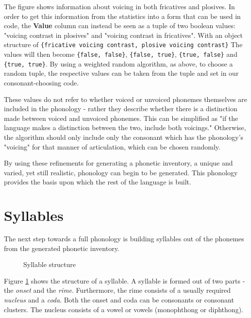 \documentclass{report}
\begin{document}
	The figure shows information about voicing in both fricatives and plosives. In order to get this information from the statistics into a form that can be used in code, the \textbf{Value} column can instead be seen as a tuple of two boolean values: "voicing contrast in plosives" and "voicing contrast in fricatives". With an object structure of \verb|{fricative voicing contrast, plosive voicing contrast}| The values will then become \verb|{false, false}|, \verb|{false, true}|, \verb|{true, false}| and \verb|{true, true}|. By using a weighted random algorithm, as above, to choose a random tuple, the respective values can be taken from the tuple and set in our consonant-choosing code.
	
	These values do not refer to whether voiced or unvoiced phonemes themselves are included in the phonology - rather they describe whether there is a distinction made between voiced and unvoiced phonemes. This can be simplified as "if the language makes a distinction between the two, include both voicings." Otherwise, the algorithm should only include only the consonant which has the phonology's "voicing" for that manner of articulation, which can be chosen randomly.
	
	By using these refinements for generating a phonetic inventory, a unique and varied, yet still realistic, phonology can begin to be generated. This phonology provides the basis upon which the rest of the language is built.

	\section{Syllables}
	
	The next step towards a full phonology is building syllables out of the phonemes from the generated phonetic inventory.
	
	\begin{figure}[h]
		\caption{Syllable structure}
		\label{syllable structure}
		\centering
	\end{figure}

	Figure \ref{syllable structure} shows the structure of a syllable. A syllable is formed out of two parts - the \textit{onset} and the \textit{rime}. Furthermore, the rime consists of a usually required \textit{nucleus} and a \textit{coda}. Both the onset and coda can be consonants or consonant clusters. The nucleus consists of a vowel or vowels (monophthong or diphthong).
	
\end{document}
